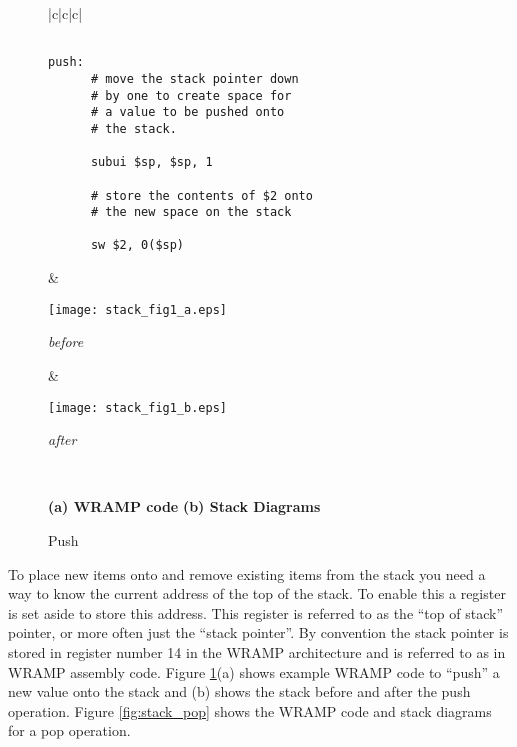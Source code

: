 %
%
\begin{figure}[!hb]
\begin{center}
\begin{footnotesize}
\begin{tabular}{|c|c|c|}

\hline
\begin{minipage}[l]{7cm}
\begin{verbatim}

push:
      # move the stack pointer down
      # by one to create space for 
      # a value to be pushed onto 
      # the stack.

      subui $sp, $sp, 1

      # store the contents of $2 onto
      # the new space on the stack

      sw $2, 0($sp)

\end{verbatim}
\end{minipage}
&
\begin{minipage}[c]{3.5cm}
\begin{center}
\texttt{[image: stack\_fig1\_a.eps]}

\emph{before}\\
\end{center}
\end{minipage}

&
\begin{minipage}[c]{3.5cm}
\begin{center}
\texttt{[image: stack\_fig1\_b.eps]}


\emph{after}\\
\end{center}
\end{minipage}
\\
\hline
\end{tabular}
\begin{center}
\small{
\textbf{(a) WRAMP code}
\hspace{3.5cm}
\textbf{(b) Stack Diagrams}
}
\end{center}

\caption{Push}
\label{fig:stack_push}
\end{footnotesize}
\end{center}
\end{figure}
%
%

To place new items onto and remove existing items from the stack you
need a way to know the current address of the top of the stack. To
enable this a register is set aside to store this address. This
register is referred to as the ``top of stack'' pointer, or more often
just the ``stack pointer''. By convention the stack pointer is stored
in register number 14 in the WRAMP architecture and is referred to as
 in WRAMP assembly code. Figure \ref{fig:stack_push}(a) shows
example WRAMP code to ``push'' a new value onto the stack and (b)
shows the stack before and after the push operation. Figure
\ref{fig:stack_pop} shows the WRAMP code and stack diagrams for a pop
operation.




